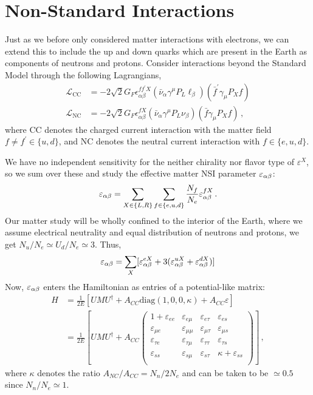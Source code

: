 \documentclass[twocolumn]{article}
\begin{document}

\section{Non-Standard Interactions}
Just as we before only considered matter interactions with electrons, we can extend this to include the up and down quarks which are present in the Earth as components of neutrons and protons. 
Consider interactions beyond the Standard Model through the following Lagrangians,
\begin{align*}
    \mathcal{L}_{\mathrm{CC}} &= -2 \sqrt{2} G_{F} \epsilon_{\alpha \beta}^{f f^{\prime} X}\left(\bar{\nu}_{\alpha} \gamma^{\mu} P_{L} \ell_{\beta}\right)\left(\bar{f}^{\prime} \gamma_{\mu} P_{X} f\right) \\
    \mathcal{L}_{\mathrm{NC}} &= -2 \sqrt{2} G_{F} \epsilon_{\alpha \beta}^{f X}\left(\bar{\nu}_{\alpha} \gamma^{\mu} P_{L} \nu_{\beta}\right)\left(\bar{f} \gamma_{\mu} P_{X} f\right)\,,
\end{align*}
where CC denotes the charged current interaction with the matter field $f\neq f^\prime \in \{u,d\}$, and NC denotes the neutral current interaction with $f \in \{e,u,d\}$. 

We have no independent sensitivity for the neither chirality nor flavor type of $\varepsilon^X$, so we sum over these and study the effective matter NSI parameter $\varepsilon_{\alpha\beta}$:
\begin{align}
    \varepsilon_{\alpha\beta} = \sum_{X \in \{L,R\}} \sum_{f \in \{e,u,d\}} \frac{N_f}{N_e} \varepsilon^{fX}_{\alpha\beta}\,.
\end{align}
Our matter study will be wholly confined to the interior of the Earth, where we assume electrical neutrality and equal distribution of neutrons and protons, we get $N_u/N_e \simeq U_d/N_e \simeq 3$. Thus,
\begin{align}
    \varepsilon_{\alpha\beta} =  \sum_X [\varepsilon_{\alpha\beta}^{eX} + 3(\varepsilon_{\alpha\beta}^{uX} + \varepsilon_{\alpha\beta}^{dX})]
\end{align}
Now, $\varepsilon_{\alpha\beta}$ enters the Hamiltonian as entries of a potential-like matrix:
\begin{align}\label{eq:NSIH}
    H &= \frac{1}{2E} \left[UMU^\dagger + A_{CC}\text{diag}(1,0,0,\kappa) + A_{CC} \varepsilon \right] \nonumber \\
      &= \frac{1}{2E} \left[UMU^\dagger + A_{CC}
      \begin{pmatrix}
          1 + \varepsilon_{ee} & \varepsilon_{e\mu} & \varepsilon_{e\tau} & \varepsilon_{es} \\
          \varepsilon_{\mu e} & \varepsilon_{\mu\mu} & \varepsilon_{\mu\tau} & \varepsilon_{\mu s} \\
          \varepsilon_{\tau e} & \varepsilon_{\tau\mu} & \varepsilon_{\tau\tau} & \varepsilon_{\tau s} \\
          \varepsilon_{ss} & \varepsilon_{s\mu} & \varepsilon_{s\tau} & \kappa+\varepsilon_{ss} \\
      \end{pmatrix} \right]\,, 
\end{align}
where $\kappa$ denotes the ratio $A_{NC}/A_{CC} = N_n/2N_e$ and can be taken to be $\simeq 0.5$ since $N_n/N_e\simeq 1$. 
\end{document}
